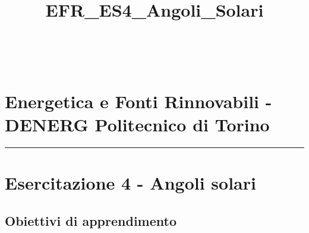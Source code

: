 \documentclass[11pt]{article}
\title{EFR\_ES4\_Angoli\_Solari}
\begin{document}
    
    \maketitle
    
    

     
            
    
    \begin{center}
    \end{center}
    { \hspace*{\fill} \\}
    

    \hypertarget{energetica-e-fonti-rinnovabili---denerg-politecnico-di-torino}{%
\section*{Energetica e Fonti Rinnovabili - DENERG Politecnico di
Torino}\label{energetica-e-fonti-rinnovabili---denerg-politecnico-di-torino}}

    \begin{center}\rule{0.5\linewidth}{0.5pt}\end{center}

    \hypertarget{esercitazione-4---angoli-solari}{%
\section{Esercitazione 4 - Angoli
solari}\label{esercitazione-4---angoli-solari}}

    \hypertarget{obiettivi-di-apprendimento}{%
\subsection{Obiettivi di
apprendimento}\label{obiettivi-di-apprendimento}}
\end{document}
